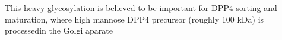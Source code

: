 This heavy glycosylation is believed to be important for DPP4 sorting and maturation, where high mannose DPP4 precursor (roughly 100 kDa) is processedin the Golgi aparate \cite{Matter_1991}